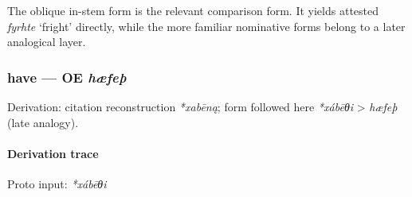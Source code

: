 \documentclass[
  british,
  a4paper,
]{article}
\begin{document}
The oblique in-stem form is the relevant comparison form. It yields
attested {\emph{fyrhte}} `fright' directly, while the more familiar
nominative forms belong to a later analogical layer.

\subsubsection{\texorpdfstring{have --- OE
\emph{hæfeþ}}{have --- OE hæfeþ}}\label{have-oe-huxe6feuxfe}

Derivation: citation reconstruction \emph{*xabēną}; form followed here
\emph{*xábēθi} \textgreater{} \emph{hæfeþ} (late analogy).

\paragraph{Derivation trace}\label{derivation-trace-154}

Proto input: \emph{*xábēθi}

\begingroup
\setlength{\fboxsep}{6pt}
\end{document}
